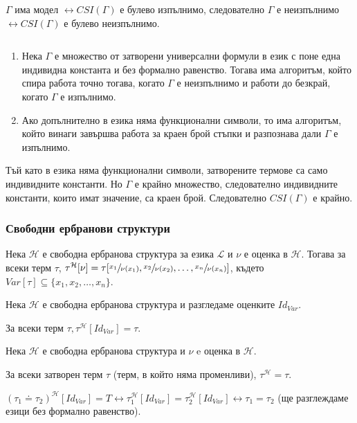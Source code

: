 \documentclass{article}
\begin{document}
\begin{claim}
$\Gamma$ има модел $\longleftrightarrow CSI(\Gamma)$ е булево изпълнимо, следователно $\Gamma$ е неизпълнимо $\longleftrightarrow CSI(\Gamma)$ е булево неизпълнимо.

\setcounter{conseq}{0}
\begin{conseq}
$\ $

\begin{enumerate}
\item Нека $\Gamma$ е множество от затворени универсални формули в език с поне една индивидна константа и без формално равенство. Тогава има алгоритъм, който спира работа точно тогава, когато $\Gamma$ е неизпълнимо и работи до безкрай, когато $\Gamma$ е изпълнимо.
\item Ако допълнително в езика няма функционални символи, то има алгоритъм, който винаги завършва работа за краен брой стъпки и разпознава дали $\Gamma$ е изпълнимо.
\end{enumerate}

\begin{remark}
Тъй като в езика няма функционални символи, затворените термове са само индивидните константи. Но $\Gamma$ е крайно множество, следователно индивидните константи, които имат значение, са краен брой. Следователно $CSI(\Gamma)$ е крайно.
\end{remark}

\end{conseq}
\end{claim}

\subsubsection*{Свободни ербранови структури}

\begin{claim}
Нека $\mathcal{H}$ е свободна ербранова структура за езика $\mathcal{L}$ и $\nu$ е оценка в $\mathcal{H}$. Тогава за всеки терм $\tau$, $\tau^\mathcal{H}[\nu] = \tau[\sfrac{x_1}{\nu(x_1)}, \sfrac{x_2}{\nu(x_2)}, \ldots, \sfrac{x_n}{\nu(x_n)}]$, където $Var[\tau] \subseteq \{x_1, x_2, \ldots, x_n\}$.

\setcounter{conseq}{0}
\begin{conseq}
Нека $\mathcal{H}$ е свободна ербранова структура и разгледаме оценките $I\!d_{V\!ar}$.

За всеки терм $\tau, \tau^\mathcal{H}[I\!d_{V\!ar}] = \tau$.
\end{conseq}

\begin{conseq}
Нека $\mathcal{H}$ е свободна ербранова структура и $\nu$ e оценка в $\mathcal{H}$.

За всеки затворен терм $\tau$ (терм, в който няма променливи), $\tau^\mathcal{H} = \tau$.

$(\tau_1 \doteq \tau_2)^\mathcal{H}[I\!d_{V\!ar}] = T \longleftrightarrow \tau_1^\mathcal{H}[I\!d_{V\!ar}] = \tau_2^\mathcal{H}[I\!d_{V\!ar}] \longleftrightarrow \tau_1 = \tau_2$ (ще разглеждаме езици без формално равенство).
\end{conseq}

\end{claim}
\end{document}
